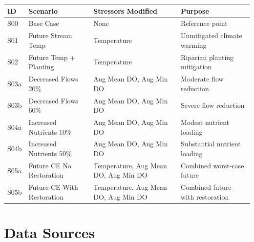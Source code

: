 \documentclass[
  letterpaper,
  DIV=11,
  numbers=noendperiod]{scrreprt}
\begin{document}
\begin{longtable}[]{@{}
  >{\raggedright\arraybackslash}p{}
  >{\raggedright\arraybackslash}p{}
  >{\raggedright\arraybackslash}p{}
  >{\raggedright\arraybackslash}p{}@{}}
\toprule\noalign{}
\begin{minipage}[b]{\linewidth}\raggedright
ID
\end{minipage} & \begin{minipage}[b]{\linewidth}\raggedright
Scenario
\end{minipage} & \begin{minipage}[b]{\linewidth}\raggedright
Stressors Modified
\end{minipage} & \begin{minipage}[b]{\linewidth}\raggedright
Purpose
\end{minipage} \\
\midrule\noalign{}
\endhead
\bottomrule\noalign{}
\endlastfoot
S00 & Base Case & None & Reference point \\
S01 & Future Stream Temp & Temperature & Unmitigated climate warming \\
S02 & Future Temp + Planting & Temperature & Riparian planting
mitigation \\
S03a & Decreased Flows 20\% & Aug Mean DO, Aug Min DO & Moderate flow
reduction \\
S03b & Decreased Flows 60\% & Aug Mean DO, Aug Min DO & Severe flow
reduction \\
S04a & Increased Nutrients 10\% & Aug Mean DO, Aug Min DO & Modest
nutrient loading \\
S04b & Increased Nutrients 50\% & Aug Mean DO, Aug Min DO & Substantial
nutrient loading \\
S05a & Future CE No Restoration & Temperature, Aug Mean DO, Aug Min DO &
Combined worst-case future \\
S05b & Future CE With Restoration & Temperature, Aug Mean DO, Aug Min DO
& Combined future with restoration \\
\end{longtable}

\section*{Data Sources}\label{data-sources}
\end{document}
